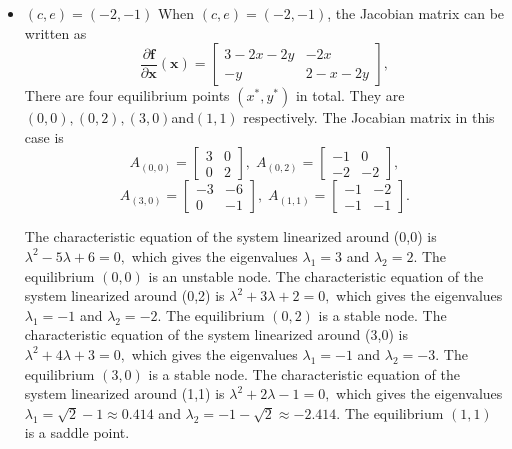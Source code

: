 \documentclass[a4paper,twocolumn]{article} %
\begin{document}
\begin{itemize}
\item $(c,e)=(-2,-1)$
When $(c,e)=(-2,-1)$, the Jacobian matrix can be written as
\begin{equation*}
    \frac{\partial\textbf{f}}{\partial \textbf{x}}(\textbf{x}) =
    \left[\begin{array}{cc}
    3-2x-2y & -2x \\
    -y & 2-x-2y
    \end{array}\right],
\end{equation*}
There are four equilibrium points $(x^*,y^*)$ in total. They are $(0,0),(0,2),(3,0)$and$(1,1)$ respectively. The Jocabian matrix in this case is
\begin{equation*}
    A_{(0,0)} =
    \left[\begin{array}{cc}
    3 & 0 \\
    0 & 2
    \end{array}\right], \; A_{(0,2)} =
    \left[\begin{array}{cc}
    -1 & 0 \\
    -2 & -2
    \end{array}\right],   
    \end{equation*}
    \begin{equation*}
    A_{(3,0)} =
    \left[\begin{array}{cc}
    -3 & -6 \\
    0 & -1
    \end{array}\right], \;A_{(1,1)} =
    \left[\begin{array}{cc}
    -1 & -2 \\
    -1 & -1
    \end{array}\right].
\end{equation*}

The characteristic equation of the system linearized around \mbox{(0,0)} is $\lambda^2 -5 \lambda + 6 = 0,$ which gives the eigenvalues $\lambda_{1} = 3$ and $\lambda_{2} = 2$. The equilibrium $(0,0)$ is an unstable node. 
The characteristic equation of the system linearized around \mbox{(0,2)} is $\lambda^2 +3 \lambda + 2 = 0,$ which gives the eigenvalues $\lambda_1 = -1$ and $\lambda_2 = -2$. The equilibrium $(0,2)$ is a stable node. 
The characteristic equation of the system linearized around \mbox{(3,0)} is
$\lambda^2 +4 \lambda + 3 = 0,$ which gives the eigenvalues $\lambda_1 = -1$ and $\lambda_2 = -3$. The equilibrium $(3,0)$ is a stable node.
The characteristic equation of the system linearized around \mbox{(1,1)} is $\lambda^2 +2 \lambda - 1 = 0,$ which gives the eigenvalues $\lambda_1 = \sqrt{2} -1 \approx 0.414$ and $\lambda_2 = -1 -\sqrt{2} \approx -2.414$. The equilibrium $(1,1)$ is a saddle point.


\end{itemize}
\end{document}
